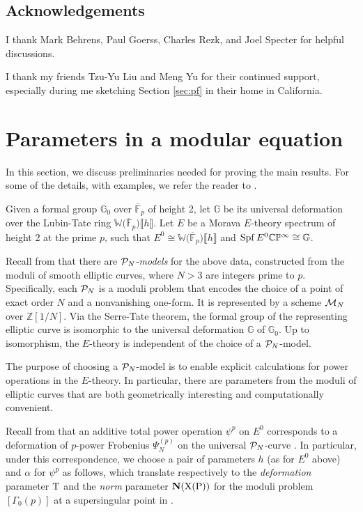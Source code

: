 \documentclass{gtpart}
\theoremstyle{definition}
\theoremstyle{remark}
\newcommand{\mb}[1]{\mathbb{#1}}
\newcommand{\Spf}{{\rm Spf\thinspace}}
\newcommand{\cF}{\overline {\mb F}}
\newcommand{\CM}{{\cal M}}
\newcommand{\CP}{{\cal P}}
\newcommand{\BC}{{\mb C}}
\newcommand{\BG}{{\mb G}}
\newcommand{\BP}{{\mb P}}
\newcommand{\BW}{{\mb W}}
\newcommand{\BZ}{{\mb Z}}
\newcommand{\A}{\alpha}
\newcommand{\G}{\Gamma}
\newcommand{\lb}{\llbracket}
\newcommand{\rb}{\rrbracket}
\renewcommand{\=}{\approx}
\renewcommand{\-}{\sim}
\numberwithin{equation}{section}
\begin{document}
\subsection{Acknowledgements}

I thank Mark Behrens, Paul Goerss, Charles Rezk, and Joel Specter for helpful 
discussions.  

I thank my friends Tzu-Yu Liu and Meng Yu for their continued support, 
especially during me sketching Section \ref{sec:pf} in their home in California.  



\section{Parameters in a modular equation}
\label{sec:parameter}

In this section, we discuss preliminaries needed for proving the main results.  
For some of the details, with examples, we refer the reader to 
\cite[Sections 2 and 3]{ho}.  

Given a formal group $\BG_0$ over $\cF_p$ of height 2, let $\BG$ be its 
universal deformation over the Lubin-Tate ring $\BW\big(\cF_p\big) \lb h \rb$.  
Let $E$ be a Morava $E$-theory spectrum of height 2 at the prime $p$, such that 
$E^0 \cong \BW\big(\cF_p\big) \lb h \rb$ and $\Spf E^0 \BC\BP^\infty \cong \BG$.  

Recall from \cite[Section 2, esp.~Definition 2.8]{ho} that there are 
{\em $\CP_N$-models} for the above data, constructed from the moduli of smooth 
elliptic curves, where $N > 3$ are integers prime to $p$.  Specifically, each 
$\CP_N$ is a moduli problem that encodes the choice of a point of exact order 
$N$ and a nonvanishing one-form.  It is represented by a scheme $\CM_N$ over 
$\BZ[1/N]$.  Via the Serre-Tate theorem, the formal group of the representing 
elliptic curve is isomorphic to the universal deformation $\BG$ of $\BG_0$.  Up 
to isomorphism, the $E$-theory is independent of the choice of a $\CP_N$-model.  

The purpose of choosing a $\CP_N$-model is to enable explicit calculations for 
power operations in the $E$-theory.  In particular, there are parameters from 
the moduli of elliptic curves that are both geometrically interesting and 
computationally convenient.  

Recall from \cite[Section 3.1]{ho} that an additive total power operation 
$\psi^p$ on $E^0$ corresponds to a deformation of $p$-power Frobenius 
$\Psi_N^{(p)}$ on the universal $\CP_N$-curve \cite[Theorem B]{cong}.  In 
particular, under this correspondence, we choose a pair of parameters $h$ (as 
for $E^0$ above) and $\A$ for $\psi^p$ as follows, which translate respectively 
to the {\em deformation} parameter $\rm T$ and the {\em norm} parameter 
$\rm {\bf N}(X(P))$ for the moduli problem $[\G_0(p)]$ at a supersingular point 
in \cite[Section 7.7]{KM}.  
\end{document}
